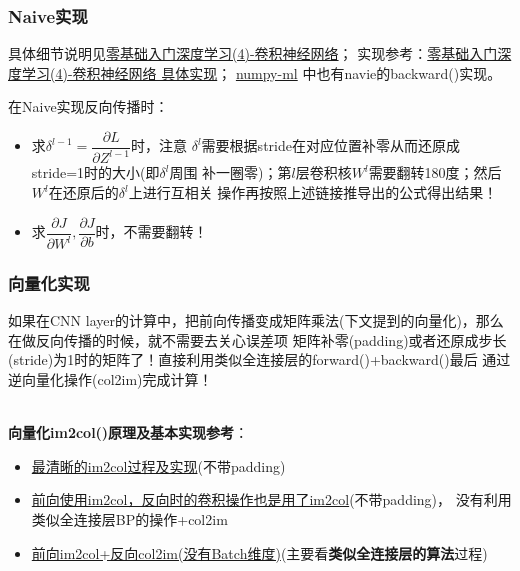 \documentclass[UTF8]{article}
\begin{document}
    \subsubsection{Naive实现}

    具体细节说明见\href{https://www.zybuluo.com/hanbingtao/note/485480}{零基础入门深度学习(4)-卷积神经网络}；
    实现参考：\href{https://github.com/hanbt/learn_dl/blob/master/cnn.py}{零基础入门深度学习(4)-卷积神经网络 具体实现}；
    \href{https://github.com/ddbourgin/numpy-ml/blob/master/numpy_ml/neural_nets/layers/layers.py}{numpy-ml}
    中也有navie的backward()实现。

    在Naive实现反向传播时：
    \begin{itemize}
        \item 求$\delta^{l-1} = \dfrac{\partial L}{\partial Z^{l-1}}$时，注意
        $\delta^{l}$需要根据stride在对应位置补零从而还原成stride=1时的大小(即$\delta^{l}$周围
        补一圈零)；第$l$层卷积核$W^{l}$需要翻转180度；然后$W^{l}$在还原后的$\delta^{l}$上进行互相关
        操作再按照上述链接推导出的公式得出结果！
        \item 求$\dfrac{\partial J}{\partial W^{l}}, \dfrac{\partial J}{\partial b}$时，不需要翻转！
    \end{itemize}

    \subsubsection{向量化实现}
    如果在CNN layer的计算中，把前向传播变成矩阵乘法(下文提到的向量化)，那么在做反向传播的时候，就不需要去关心误差项
    矩阵补零(padding)或者还原成步长(stride)为1时的矩阵了！直接利用类似全连接层的forward()+backward()最后
    通过逆向量化操作(col2im)完成计算！

\hspace*{\fill} \\
    \textbf{向量化im2col()原理及基本实现参考}：
    \begin{itemize}
        \item \href{https://zhuanlan.zhihu.com/p/63974249}{最清晰的im2col过程及实现}(不带padding)
        \item \href{https://zhuanlan.zhihu.com/p/40951745}{前向使用im2col，反向时的卷积操作也是用了im2col}(不带padding)，
        没有利用类似全连接层BP的操作+col2im
        \item \href{https://zhuanlan.zhihu.com/p/92722347}{前向im2col+反向col2im(没有Batch维度)}(主要看\textbf{类似全连接层的算法}过程)
    \end{itemize}
\end{document}
